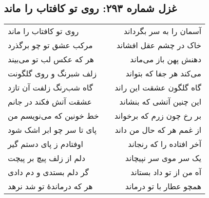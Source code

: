 \begin{center}
\section*{غزل شماره ۲۹۳: روی تو کافتاب را ماند}
\label{sec:293}
\begin{longtable}{l p{0.5cm} r}
روی تو کافتاب را ماند
&&
آسمان را به سر بگرداند
\\
مرکب عشق تو چو برگذرد
&&
خاک در چشم عقل افشاند
\\
هر که عکس لب تو می‌بیند
&&
دهنش پهن باز می‌ماند
\\
زلف شبرنگ و روی گلگونت
&&
می‌کند هر جفا که بتواند
\\
گاه شب‌رنگ زلفت آن تازد
&&
گاه گلگون عشقت این راند
\\
عشقت آتش فکند در جانم
&&
این چنین آتشی که بنشاند
\\
خط خونین که می‌نویسم من
&&
بر رخ چون زرم که برخواند
\\
پای تا سر چو ابر اشک شود
&&
از غمم هر که حال من داند
\\
اوفتادم ز پای دستم گیر
&&
آخر افتاده را که رنجاند
\\
دلم از زلف پیچ بر پیچت
&&
یک سر موی سر نپیچاند
\\
گر دلم بستدی و دم دادی
&&
آه من از تو داد بستاند
\\
هر که درماندهٔ تو شد نرهد
&&
همچو عطار با تو درماند
\\
\end{longtable}
\end{center}
